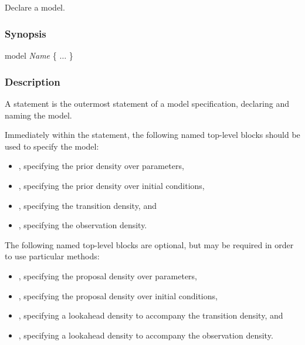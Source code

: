 \subsection{\label{model}}

Declare a model.

\subsubsection*{Synopsis\label{model_Synopsis}}
\begin{bicode}
model \textsl{Name} \{
  \(\ldots\)
\}
\end{bicode}

\subsubsection*{Description\label{model_Description}}

A  statement is the outermost statement of a model specification,
declaring and naming the model.

Immediately within the  statement, the following named top-level blocks should
be used to specify the model:
\begin{itemize}
\item {}, specifying the prior density over parameters,
\item {}, specifying the prior density over initial conditions,
\item {}, specifying the transition density, and
\item {}, specifying the observation density.
\end{itemize}

The following named top-level blocks are optional, but may be required in order to use particular methods:
\begin{itemize}
\item {}, specifying the proposal density over parameters,
\item {}, specifying the proposal density over initial conditions,
\item {}, specifying a lookahead density to accompany the transition density, and
\item {}, specifying a lookahead density to accompany the observation density.
\end{itemize}

